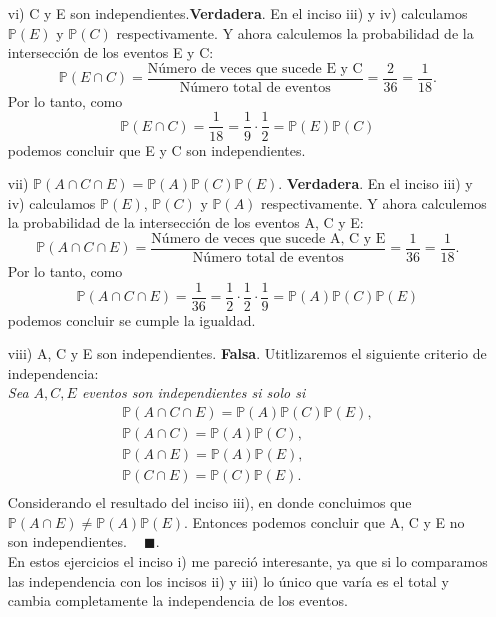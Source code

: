 \documentclass[11pt,letterpaper]{article}
\newcommand{\mP}{\mathbb{P}}
\newcommand{\finf}{\blacksquare.}
\begin{document}
\begin{itemize}
\begin{itemize}
\item[vi)] C y E son independientes.\textbf{Verdadera}. En el inciso iii) y iv) calculamos $\mP(E)$ y $\mP(C)$ respectivamente. Y ahora calculemos la probabilidad de la intersección de los eventos E y C:
$$\mP(E\cap C)= \frac{\text{Número de veces que sucede E y C}}{\text{Número total de eventos}}=\frac{2}{36}=\frac{1}{18}.$$
Por lo tanto, como
$$\mP(E\cap C)= \frac{1}{18} = \frac{1}{9}\cdot \frac{1}{2}=\mP(E)\mP(C)$$
podemos concluir que E y C son independientes.

\item[vii)] $\mP (A \cap C \cap E) = \mP (A)\mP (C)\mP (E)$. \textbf{Verdadera}. En el inciso iii) y iv) calculamos $\mP(E)$, $\mP(C)$ y $\mP(A)$ respectivamente. Y ahora calculemos la probabilidad de la intersección de los eventos A, C y E:
$$\mP(A\cap C\cap E)= \frac{\text{Número de veces que sucede A, C y E}}{\text{Número total de eventos}}=\frac{1}{36}=\frac{1}{18}.$$
Por lo tanto, como
$$\mP(A\cap C\cap E)= \frac{1}{36} = \frac{1}{2}\cdot \frac{1}{2} \cdot\frac{1}{9}=\mP(A)\mP(C)\mP(E)$$
podemos concluir se cumple la igualdad. 

\item[viii)] A, C y E son
independientes. \textbf{Falsa}. Utitlizaremos el siguiente criterio de independencia:\\

\textit{Sea $A, C, E$ eventos son independientes si solo si
\begin{equation*}
\begin{array}{c}
\mP(A\cap C \cap E) =\mP(A)\mP(C)\mP(E),\\
\mP(A\cap C)= \mP(A)\mP(C),\\
\mP(A\cap E)= \mP(A)\mP(E),\\
\mP(C\cap E)= \mP(C)\mP(E).\\
\end{array}
\end{equation*}
}
Considerando el resultado del inciso iii), en donde concluimos que $\mP(A\cap E)\neq\mP(A)\mP(E)$. Entonces podemos concluir que A, C y E no son independientes. $\ \ \ \ \finf$\\

En estos ejercicios el inciso i) me pareció interesante, ya que si lo comparamos las independencia con los incisos ii) y iii) lo único que varía es el total y cambia completamente la independencia de los eventos.
\end{itemize}
\end{itemize}
\end{document}
